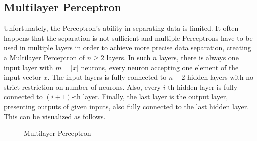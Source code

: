 \subsection{Multilayer Perceptron}
\label{sec:multilayer_perceptron}
Unfortunately, the Perceptron's ability in separating data is limited. It often happens that the separation is not sufficient and multiple Perceptrons have to be used in multiple layers in order to achieve more precise data separation, creating a Multilayer Perceptron of $n \geq 2$ layers. In such $n$ layers, there is always one input layer with $m = |x|$ neurons, every neuron accepting one element of the input vector $x$. The input layers is fully connected to $n-2$ hidden layers with no strict restriction on number of neurons. Also, every $i$-th hidden layer is fully connected to $(i+1)$-th layer. Finally, the last layer is the output layer, presenting outputs of given inputs, also fully connected to the last hidden layer. This can be visualized as follows.

\vspace{1em}
\begin{figure}[H]
\caption{Multilayer Perceptron}
\centering
{}
\end{figure}

